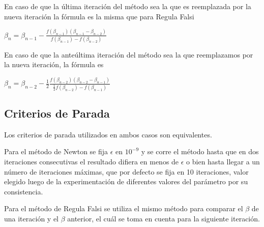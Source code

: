 En caso de que la \'ultima iteraci\'on del m\'etodo sea la que es reemplazada por la nueva iteraci\'on la f\'ormula es la misma que para Regula Falsi

$\beta_n = \beta_{n-1} - \frac{f(\beta_{n-1}) (\beta_{n-1}-\beta_{n-2})}{f(\beta_{n-1}) - f(\beta_{n-2})}$

En caso de que la ante\'ultima iteraci\'on del m\'etodo sea la que reemplazamos por la nueva iteraci\'on, la f\'ormula es

$\beta_n = \beta_{n-2} - \frac{1}{2}\frac{f(\beta_{n-2}) (\beta_{n-2}-\beta_{n-1})}{\frac{1}{2}f(\beta_{n-2}) - f(\beta_{n-1})}$

\subsection{Criterios de Parada}	

Los criterios de parada utilizados en ambos casos son equivalentes.

Para el m\'etodo de Newton se fija $\epsilon$ en $10^{-9}$ y se corre el m\'etodo hasta que en dos iteraciones consecutivas el resultado difiera en menos de $\epsilon$ o bien hasta llegar a un n\'umero de iteraciones m\'aximas, que por defecto se fija en 10 iteraciones, valor elegido luego de la experimentaci\'on de diferentes valores del par\'ametro por su consistencia.

Para el m\'etodo de Regula Falsi se utiliza el mismo m\'etodo para comparar el $\beta$ de una iteraci\'on y el $\beta$ anterior, el cu\'al se toma en cuenta para la siguiente iteraci\'on.
